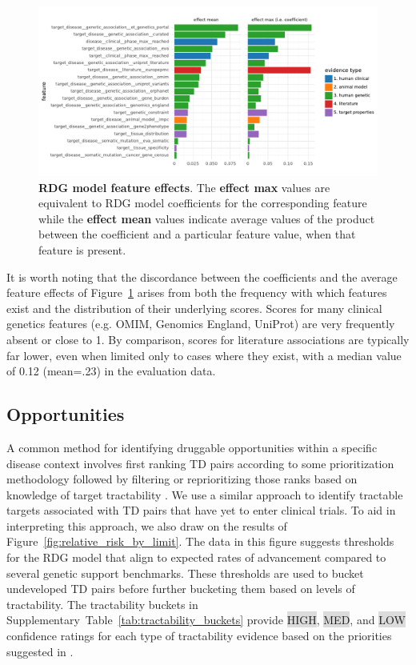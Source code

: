 \documentclass{article}
\begin{document}
\begin{figure}[!htb]
	\centering
  \captionsetup{width=.9\linewidth}
	\includegraphics[width=1\textwidth]{effect_sizes.pdf}
  \caption{
    \textbf{RDG model feature effects}. The \textbf{effect max} values are equivalent to RDG model coefficients for the corresponding feature while the \textbf{effect mean} values indicate average values of the product between the coefficient and a particular feature value, when that feature is present.
  }
	\label{fig:effect_sizes}
\end{figure}

It is worth noting that the discordance between the coefficients and the average feature effects of Figure~\ref{fig:effect_sizes} arises from both the frequency with which features exist and the distribution of their underlying scores. Scores for many clinical genetics features (e.g. OMIM, Genomics England, UniProt) are very frequently absent or close to 1. By comparison, scores for literature associations are typically far lower, even when limited only to cases where they exist, with a median value of 0.12 (mean=.23) in the evaluation data.

\subsection{Opportunities}
\label{sec:results_opportunities}

A common method for identifying druggable opportunities within a specific disease context involves first ranking TD pairs according to some prioritization methodology followed by filtering or reprioritizing those ranks based on knowledge of target tractability \cite{PMID:28356508,PMID:35401535,PMID:31253980}. We use a similar approach to identify tractable targets associated with TD pairs that have yet to enter clinical trials. To aid in interpreting this approach, we also draw on the results of Figure~\ref{fig:relative_risk_by_limit}. The data in this figure suggests thresholds for the RDG model that align to expected rates of advancement compared to several genetic support benchmarks. These thresholds are used to bucket undeveloped TD pairs before further bucketing them based on levels of tractability. The tractability buckets in Supplementary~Table~\ref{tab:tractability_buckets} provide \colorbox{Gainsboro}{HIGH}, \colorbox{Gainsboro}{MED}, and \colorbox{Gainsboro}{LOW} confidence ratings for each type of tractability evidence based on the priorities suggested in \cite{OTTractability}.
\end{document}
